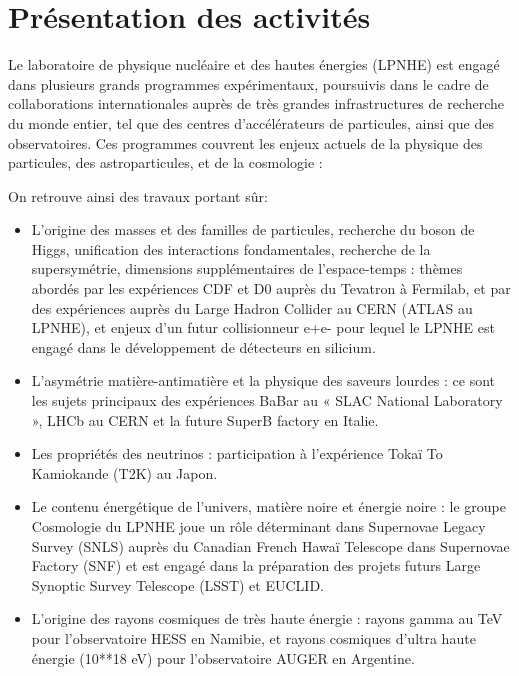 \documentclass[french,a4paper,12pt]{report}
\begin{document}
  \section{Présentation des activités}
  Le laboratoire de physique nucléaire et des hautes énergies (LPNHE) est engagé dans plusieurs grands programmes expérimentaux, poursuivis dans le cadre de collaborations internationales auprès de très grandes infrastructures de recherche du monde entier, tel que des centres d’accélérateurs de particules, ainsi que des observatoires. Ces programmes couvrent les enjeux actuels de la physique des particules, des astroparticules, et de la cosmologie :
  
  On retrouve ainsi des travaux portant sûr:  
  \begin{itemize}
  \item L'origine des masses et des familles de particules, recherche du boson de Higgs, unification des interactions fondamentales, recherche de la supersymétrie, dimensions supplémentaires de l’espace-temps : thèmes abordés par les expériences CDF et D0 auprès du Tevatron à Fermilab, et par des expériences auprès du Large Hadron Collider au CERN (ATLAS au LPNHE), et enjeux d’un futur collisionneur e+e- pour lequel le LPNHE est engagé dans le développement de détecteurs en silicium.
  
  \item L’asymétrie matière-antimatière et la physique des saveurs lourdes : ce sont les sujets principaux des expériences BaBar au « SLAC National Laboratory », LHCb au CERN et la future SuperB factory en Italie.
  
  \item Les propriétés des neutrinos : participation à l’expérience Tokaï To Kamiokande (T2K) au Japon.
  
  \item Le contenu énergétique de l’univers, matière noire et énergie noire : le groupe Cosmologie du LPNHE joue un rôle déterminant dans Supernovae Legacy Survey (SNLS) auprès du Canadian French Hawaï Telescope dans Supernovae Factory (SNF) et est engagé dans la préparation des projets futurs Large Synoptic Survey Telescope (LSST) et EUCLID.
  
  \item L'origine des rayons cosmiques de très haute énergie : rayons gamma au TeV pour l’observatoire HESS en Namibie, et rayons cosmiques d’ultra haute énergie (10**18 eV) pour l’observatoire AUGER en Argentine.
  \end{itemize}
  
\end{document}
